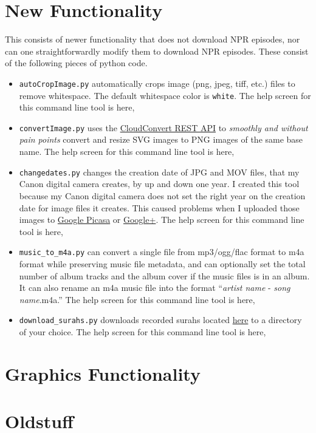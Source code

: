 \documentclass[]{article}
\begin{document}
\section{New Functionality}\label{sec:new_functionality}
This consists of newer functionality that does not download NPR episodes, nor can one straightforwardly modify them to download NPR episodes. These consist of the following pieces of python code.
\begin{itemize}
 \item {\verb|autoCropImage.py|} automatically crops image (png, jpeg, tiff, etc.) files to remove whitespace. The default whitespace color is {\verb|white|}. The help screen for this command line tool is here,
 
 
 \item {\verb|convertImage.py|} uses the \href{https://cloudconvert.com/apiconsole}{CloudConvert REST API} to \textit{smoothly and without pain points} convert and resize SVG images to PNG images of the same base name. The help screen for this command line tool is here,
 
 
 \item {\verb|changedates.py|} changes the creation date of JPG and MOV files, that my Canon digital camera creates, by up and down one year. I created this tool because my Canon digital camera does not set the right year on the creation date for image files it creates. This caused problems when I uploaded those images to \href{https://picasa.google.com/}{Google Picasa} or \href{https://plus.google.com/}{Google+}. The help screen for this command line tool is here,
 
 
 \item {\verb|music_to_m4a.py|} can convert a single file from mp3/ogg/flac format to m4a format while preserving music file metadata, and can optionally set the total number of album tracks and the album cover if the music files is in an album. It can also rename an m4a music file into the format ``\textit{artist name} - \textit{song name}.m4a.'' The help screen for this command line tool is here,
 
 
 \item {\verb|download_surahs.py|} downloads recorded surahs located \href{http://quranicaudio.com/quran/109}{here} to a directory of your choice. The help screen for this command line tool is here,
 
\end{itemize}

\section{Graphics Functionality}\label{sec:graphics_functionality}

\section{Oldstuff}\label{sec:oldstuff}
\end{document}
